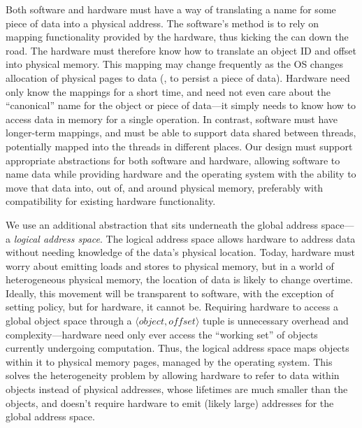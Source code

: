 Both software and hardware must have a way of translating a
name for some piece of data into a physical address. The software's method is to rely on mapping functionality provided
by the hardware, thus kicking the can down the road. The hardware must therefore know how to translate an object ID and
offset into physical memory.
This mapping may change frequently as the OS changes allocation of physical
pages to data (\eg, to persist a piece of data).
Hardware need only know
the mappings for a short time, and need not even care about the ``canonical''
name for the object or piece of data---it simply needs to know
how to access data in memory
for a single operation. In contrast, software must have longer-term mappings, and must
be able to support data shared between threads, potentially mapped into the threads
in different places.
Our design must support appropriate abstractions for both software and hardware,
allowing software to name data while providing hardware and
the operating system with the ability to move that data into, out of, and around physical memory, preferably with
compatibility for
existing hardware functionality.

We use an additional abstraction that sits underneath the global address space---a \emph{logical address space}. The
logical address space allows hardware to address data without needing knowledge of the data's physical location. Today,
hardware must worry about emitting loads and stores to physical memory, but in a world of heterogeneous physical memory,
the location of data is likely to change overtime. Ideally, this movement will be transparent to software, with the
exception of setting policy, but for hardware, it cannot be. Requiring hardware to access a global object space through a $\langle \mathit{object},
    \mathit{offset} \rangle$ tuple is unnecessary overhead and complexity---hardware need only ever
access the ``working set'' of objects currently undergoing computation. Thus, the logical address space
maps objects within it to physical memory pages, managed by the
operating system. This solves the heterogeneity problem by allowing hardware to refer to data within
objects instead of physical addresses, whose lifetimes are much smaller than the objects, and
doesn't require hardware to emit (likely large) addresses for the global address space.


